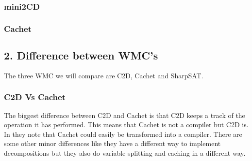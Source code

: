 \documentclass[a4paper,10pt]{report}
\begin{document}
\subsubsection*{mini2CD}

\subsubsection*{Cachet}

\subsection*{2. Difference between WMC's}
The three WMC we will compare are C2D, Cachet and SharpSAT.

\subsubsection*{C2D Vs Cachet}

The biggest difference between C2D and Cachet is that C2D keeps a track of the operation it has performed. This means that Cachet is not a compiler but C2D is. In \cite{CHAVIRA2008772} they note that Cachet could easily be transformed into a compiler. There are some other minor differences like they have a different way to implement decompositions but they also do variable splitting and caching in a different way.

\end{document}
